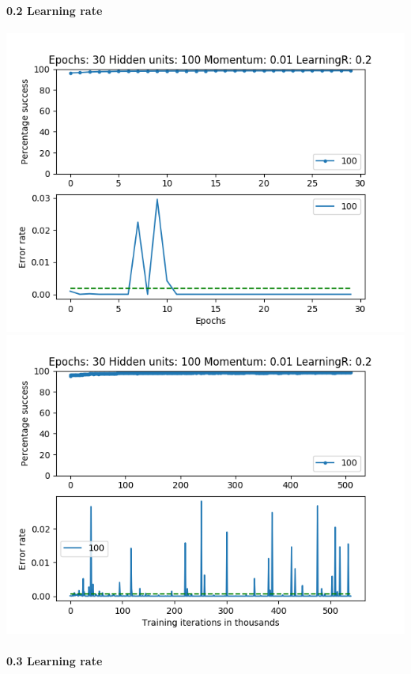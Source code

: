 \documentclass[11pt]{article}
\makeatletter
\def\maxwidth{\ifdim\Gin@nat@width>\linewidth\linewidth
    \else\Gin@nat@width\fi}
\let\Oldincludegraphics\includegraphics
\renewcommand{\includegraphics}[1]{\Oldincludegraphics[width=.8\maxwidth]{#1}}
\makeatother
\begin{document}
\hypertarget{learning-rate-1}{%
\paragraph{0.2 Learning rate}\label{learning-rate-1}}

\includegraphics{Experiment1/E1_NN_Epoch_Momentum_0.01_30Epochs_100_LR_0.2_Hiddenunits.png}
\includegraphics{Experiment1/E1_NN_Training_Momentum_0.01_30Epochs_100_LR_0.2_Hiddenunits.png}

\hypertarget{learning-rate-2}{%
\paragraph{0.3 Learning rate}\label{learning-rate-2}}
\end{document}
